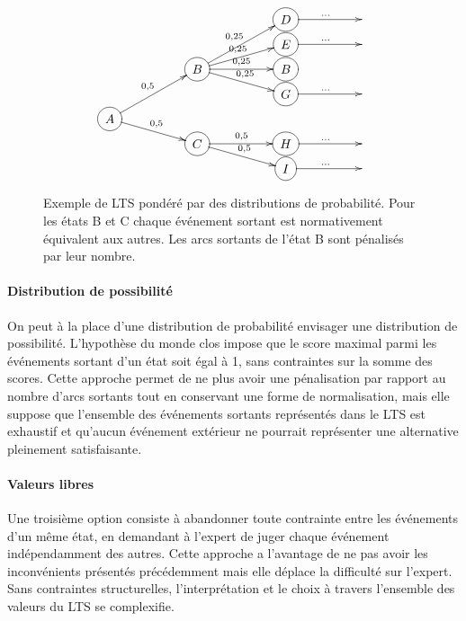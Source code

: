     \begin{figure}[h!]
    \centering
    \[
        \xymatrix @R=0.1em@C=5em {
            & & *++[o][F-]{D} \ar[r]^{\dots} &
        \\ & & *++[o][F-]{E} \ar[r]^{\dots}&
        \\ & *++[o][F-]{B} \ar[ruu]^{0,25}\ar[ru]^{0,25}\ar[r]^{0,25}\ar[rd]^{0,25}& *++[o][F-]{B}&
        \\ & & *++[o][F-]{G} \ar[r]^{\dots}&
        \\  *++[o][F-]{A} \ar[ruu]^{0,5} \ar[rd]^{0,5}& & &
        \\ & *++[o][F-]{C}\ar[r]^{0,5} \ar[rd]^{0,5}&*++[o][F-]{H} \ar[r]^{\dots} &
        \\ & & *++[o][F-]{I} \ar[r]^{\dots}& 
        }            
    \]
    \captionsetup{width = 0.6\textwidth}
    \caption{Exemple de LTS pondéré par des distributions de probabilité. Pour les états B et C chaque événement sortant est normativement équivalent aux autres. Les arcs sortants de l'état B sont pénalisés par leur nombre.}
    \label{graph_prob}
\end{figure}

\paragraph{Distribution de possibilité}

On peut à la place d'une distribution de probabilité envisager une distribution de possibilité. L'hypothèse du monde clos impose que le score maximal parmi les événements sortant d'un état soit égal à 1, sans contraintes sur la somme des scores. Cette approche permet de ne plus avoir une pénalisation par rapport au nombre d'arcs sortants tout en conservant une forme de normalisation, mais elle suppose que l'ensemble des événements sortants représentés dans le LTS est exhaustif et qu'aucun événement extérieur ne pourrait représenter une alternative pleinement satisfaisante.

\paragraph{Valeurs libres}

Une troisième option consiste à abandonner toute contrainte entre les événements d'un même état, en demandant à l'expert de juger chaque événement indépendamment des autres. Cette approche a l'avantage de ne pas avoir les inconvénients présentés précédemment mais elle déplace la difficulté sur l'expert. Sans contraintes structurelles, l'interprétation et le choix à travers l'ensemble des valeurs du LTS se complexifie.


